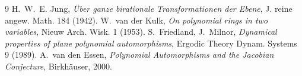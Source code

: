 \begin{thebibliography}{9}
 H.~W.~E. Jung, \emph{Über ganze birationale Transformationen der Ebene}, J. reine angew. Math. 184 (1942).
 W.~van der Kulk, \emph{On polynomial rings in two variables}, Nieuw Arch. Wisk. 1 (1953).
 S.~Friedland, J.~Milnor, \emph{Dynamical properties of plane polynomial automorphisms}, Ergodic Theory Dynam. Systems 9 (1989).
 A.~van den Essen, \emph{Polynomial Automorphisms and the Jacobian Conjecture}, Birkhäuser, 2000.
\end{thebibliography}
